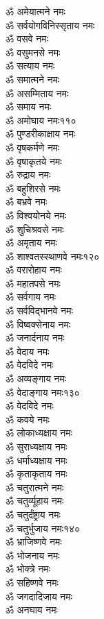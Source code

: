 \begin{center}
\begin{multicols}{2}
\begin{flushleft}
ॐ अमेयात्मने नमः\\
ॐ सर्वयोगविनिस्सृताय नमः\\
ॐ वसवे नमः\\
ॐ वसुमनसे नमः\\
ॐ सत्याय नमः\\
ॐ समात्मने नमः\\
ॐ असम्मिताय नमः\\
ॐ समाय नमः\\
ॐ अमोघाय नमः\hfill ११०\\
ॐ पुण्डरीकाक्षाय नमः\\
ॐ वृषकर्मणे नमः\\
ॐ वृषाकृतये नमः\\
ॐ रुद्राय नमः\\
ॐ बहुशिरसे नमः\\
ॐ बभ्रवे नमः\\
ॐ विश्वयोनये नमः\\
ॐ शुचिश्रवसे नमः\\
ॐ अमृताय नमः\\
ॐ शाश्वतस्स्थाणवे नमः\hfill १२०\\
ॐ वरारोहाय नमः\\
ॐ महातपसे नमः\\
ॐ सर्वगाय नमः\\
ॐ सर्वविद्भानवे नमः\\
ॐ विष्वक्सेनाय नमः\\
ॐ जनार्दनाय नमः\\
ॐ वेदाय नमः\\
ॐ वेदविदे नमः\\
ॐ अव्यङ्गाय नमः\\
ॐ वेदाङ्गाय नमः\hfill १३०\\
ॐ वेदविदे नमः\\
ॐ कवये नमः\\
ॐ लोकाध्यक्षाय नमः\\
ॐ सुराध्यक्षाय नमः\\
ॐ धर्माध्यक्षाय नमः\\
ॐ कृताकृताय नमः\\
ॐ चतुरात्मने नमः\\
ॐ चतुर्व्यूहाय नमः\\
ॐ चतुर्दंष्ट्राय नमः\\
ॐ चतुर्भुजाय नमः\hfill १४०\\
ॐ भ्राजिष्णवे नमः\\
ॐ भोजनाय नमः\\
ॐ भोक्त्रे नमः\\
ॐ सहिष्णवे नमः\\
ॐ जगदादिजाय नमः\\
ॐ अनघाय नमः\\

\end{flushleft}
\end{multicols}
\end{center}
